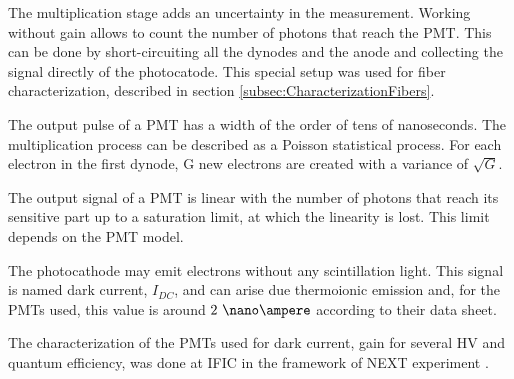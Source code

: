 \begin{enumerate}
The multiplication stage adds an uncertainty in the measurement. Working without gain allows to count the number of photons that reach the PMT. This can be done by short-circuiting all the dynodes and the anode and collecting the signal directly of the photocatode. This special setup was used for fiber characterization, described in section \ref{subsec:CharacterizationFibers}.


\end{enumerate}

The output pulse of a PMT has a width of the order of tens of nanoseconds. The multiplication process can be described as a Poisson statistical process. For each electron in the first dynode, G new electrons are created with a variance of $\sqrt{G}$.

The output signal of a PMT is linear with the number of photons that reach its sensitive part up to a saturation limit, at which the linearity is lost. This limit depends on the PMT model.

The photocathode may emit electrons without any scintillation light. This signal is named dark current, $I_{DC}$, and can  arise due thermoionic emission and, for the PMTs used, this value is around $2~\nano\ampere$ according to their data sheet.

The characterization of the PMTs used for dark current, gain for several HV and quantum efficiency,  was done at IFIC in the framework of NEXT experiment \cite{CalibrationPMTsNEXT}. 